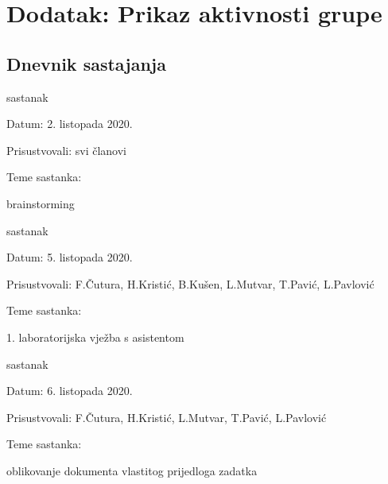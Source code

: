 \chapter*{Dodatak: Prikaz aktivnosti grupe}
		
		\section*{Dnevnik sastajanja}
	
		
		\begin{packed_enum}
			\item  sastanak
			
			\item[] \begin{packed_item}
				\item Datum: 2. listopada 2020.
				\item Prisustvovali: svi članovi
				\item Teme sastanka:
				\begin{packed_item}
					\item brainstorming
				\end{packed_item}
			\end{packed_item}
			
			\item  sastanak
			\item[] \begin{packed_item}
				\item Datum: 5. listopada 2020.
				\item Prisustvovali: F.Čutura, H.Kristić, B.Kušen, L.Mutvar, T.Pavić, L.Pavlović
				\item Teme sastanka:
				\begin{packed_item}
					\item  1. laboratorijska vježba s asistentom
				\end{packed_item}
			\end{packed_item}
		
			\item  sastanak
			\item[] \begin{packed_item}
				\item Datum: 6. listopada 2020.
				\item Prisustvovali: F.Čutura, H.Kristić, L.Mutvar, T.Pavić, L.Pavlović
				\item Teme sastanka:
				\begin{packed_item}
					\item  oblikovanje dokumenta vlastitog prijedloga zadatka
				\end{packed_item}
			\end{packed_item}
		

\end{packed_enum}
